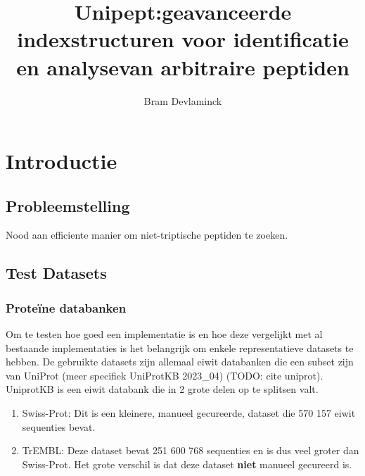 \documentclass[11pt,dutch,faculty=we,layout=titlefont,underline=false,titleUppercase=true,titleUnderline=true]{ugent2016-report}
\author{Bram Devlaminck}
\title{Unipept:\newline geavanceerde indexstructuren \newline voor identificatie en analyse\newline van arbitraire peptiden}
\begin{document}
    \maketitle


    \setmonofont[Scale=MatchLowercase,Contextuals={Alternate}]{Jetbrains Mono}



    {\hypersetup{hidelinks}\tableofcontents} %
    \newpage




    \chapter{Introductie}\label{sec:introductie}


    \section{Probleemstelling}
    Nood aan efficiente manier om niet-triptische peptiden te zoeken.


    \section{Test Datasets}\label{sec:datasets}

    \subsection{Proteïne databanken}
    Om te testen hoe goed een implementatie is en hoe deze vergelijkt met al bestaande implementaties is het belangrijk om enkele representatieve datasets te hebben.
    De gebruikte datasets zijn allemaal eiwit databanken die een subset zijn van UniProt (meer specifiek UniProtKB 2023\_04) (TODO: cite uniprot).
    UniprotKB is een eiwit databank die in 2 grote delen op te splitsen valt.
    \begin{enumerate}
        \item Swiss-Prot: Dit is een kleinere, manueel gecureerde, dataset die 570 157 eiwit sequenties bevat.
        \item TrEMBL: Deze dataset bevat 251 600 768 sequenties en is dus veel groter dan Swiss-Prot.
        Het grote verschil is dat deze dataset \textbf{niet} manueel gecureerd is.
    \end{enumerate}
\end{document}
